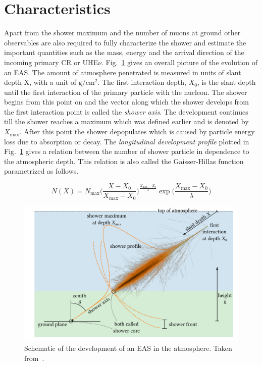 \section{Characteristics}
\label{sec:EAS_cha}
Apart from the shower maximum and the number of muons at ground other observables are also required to fully characterize the shower and estimate the important quantities such as the mass, energy and the arrival direction of the incoming primary CR or UHE$\nu$. Fig.~\ref{fig:EAS_schematic} gives an overall picture of the evolution of an EAS. The amount of atmosphere penetrated is measured in units of slant depth X, with a unit of $\mathrm{g/cm^2}$. The first interaction depth, $X_0$, is the slant depth until the first interaction of the primary particle with the nucleon. The shower begins from this point on and the vector along which the shower develops from the first interaction point is called the \textit{shower axis}. The development continues till the shower reaches a maximum which was defined earlier and is denoted by $X_{\text{max}}$. After this point the shower depopulates which is caused by particle energy loss due to absorption or decay. The \textit{longitudinal development profile} plotted in Fig.~\ref{fig:EAS_schematic} gives a relation between the number of shower particle in dependence to the atmospheric depth. This relation is also called the Gaisser-Hillas function~\cite{1977ICRC....8..353G} parametrized as follows.

\begin{equation}
    N(X) =  N_{\text{max}} \biggl(\frac{X- X_0}{X_{\text{max}} -  X_0}\biggr)^{\frac{X_{\text{max}}-X_0}{\lambda}} \exp \biggl(\frac{X_{\text{max}}-X_0}{\lambda}\biggr)
\end{equation}

\begin{figure}[t!]
    \centering
    \includegraphics[width=14.5cm]{thesis_figures/EAS/EAS_schematic.png}
    \caption{Schematic of the development of an EAS in the atmosphere. Taken from~\cite{thesis:mayotte2021}.} 
    \label{fig:EAS_schematic}
\end{figure}

